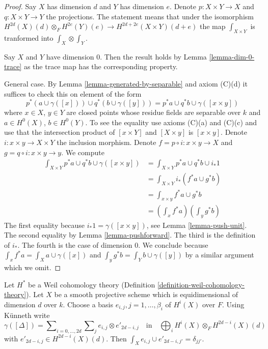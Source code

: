 \begin{proof}
Say $X$ has dimension $d$ and $Y$ has dimension $e$.
Denote $p : X \times Y \to X$ and $q : X \times Y \to Y$ the
projections. The statement means that under the isomorphism
$H^{2d}(X)(d) \otimes_F H^{2e}(Y)(e) \to H^{2d + 2e}(X \times Y)(d + e)$
the map $\int_{X \times Y}$ is tranformed into $\int_X \otimes \int_Y$.

\medskip\noindent
Say $X$ and $Y$ have dimension $0$. Then the result holds by
Lemma \ref{lemma-dim-0-trace} as the trace map has the corresponding property.

\medskip\noindent
General case. By Lemma \ref{lemma-generated-by-separable} and axiom (C)(d)
it suffices to check this on element of the form
$$
p^*(a \cup \gamma([x])) \cup q^*(b \cup \gamma([y])) =
p^*a \cup q^*b \cup \gamma([x \times y])
$$
where $x \in X$, $y \in Y$ are closed points whose residue fields are
separable over $k$ and $a \in H^0(X)$, $b \in H^0(Y)$. To see the
equality use axioms (C)(a) and (C)(c) and use that the intersection
product of $[x \times Y]$ and $[X \times y]$ is $[x \times y]$.
Denote $i : x \times y \to X \times Y$ the inclusion morphism.
Denote $f = p \circ i : x \times y \to X$ and
$g = q \circ i : x \times y \to y$. We compute
\begin{align*}
\int_{X \times Y} p^*a \cup q^*b \cup \gamma([x \times y])
& =
\int_{X \times Y} p^*a \cup q^*b \cup i_*1 \\
& =
\int_{X \times Y} i_*(f^*a \cup g^*b) \\
& =
\int_{x \times y} f^*a \cup g^*b \\
& =
(\int_x f^*a) (\int_y g^*b)
\end{align*}
The first equality because $i_*1 = \gamma([x \times y])$, see
Lemma \ref{lemma-push-unit}. The second equality by
Lemma \ref{lemma-pushforward}. The third is the definition of $i_*$.
The fourth is the case of dimension $0$.
We conclude because
$\int_x f^*a = \int_X a \cup \gamma([x])$ and
$\int_y g^*b = \int_Y b \cup \gamma([y])$
by a similar argument which we omit.
\end{proof}

\begin{lemma}
\label{lemma-class-diagonal}
Let $H^*$ be a Weil cohomology theory
(Definition \ref{definition-weil-cohomology-theory}).
Let $X$ be a smooth projective scheme which is equidimensional
of dimension $d$ over $k$. Choose a basis
$e_{i, j}, j = 1, \ldots, \beta_i$ of $H^i(X)$ over $F$.
Using K\"unneth write
$$
\gamma([\Delta]) =
\sum\nolimits_{i = 0, \ldots, 2d}
\sum\nolimits_j e_{i, j} \otimes e'_{2d - i , j}
\quad\text{in}\quad
\bigoplus\nolimits_i H^i(X) \otimes_F H^{2d - i}(X)(d)
$$
with $e'_{2d - i, j} \in H^{2d - i}(X)(d)$.
Then $\int_X e_{i, j} \cup e'_{2d - i, j'} = \delta_{jj'}$.
\end{lemma}

